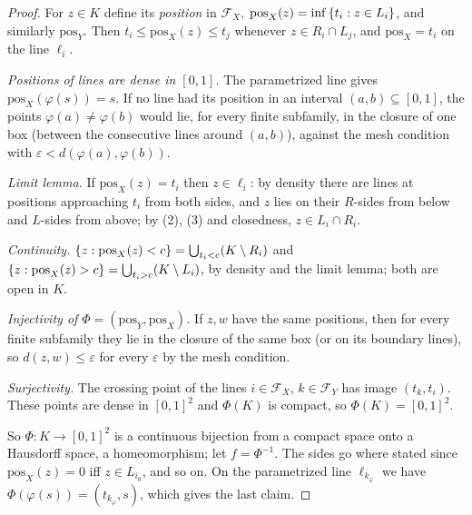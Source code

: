\begin{proof}
For $z\in K$ define its \emph{position} in $\mathcal F_X$, $\mathrm{pos}_X(z)=\inf\left\{ t_i:z\in L_i \right\}$, and similarly $\mathrm{pos}_Y$.
Then $t_i\le\mathrm{pos}_X(z)\le t_j$ whenever $z\in R_i\cap L_j$, and $\mathrm{pos}_X=t_i$ on the line $\ell_i$.

\emph{Positions of lines are dense in $[0,1]$.} The parametrized line gives $\mathrm{pos}_X(\varphi(s))=s$. If no line had its
position in an interval $(a,b)\subseteq[0,1]$, the points $\varphi(a)\ne\varphi(b)$ would lie, for every finite subfamily, in the
closure of one box (between the consecutive lines around $(a,b)$), against the mesh condition with $\varepsilon<d(\varphi(a),
\varphi(b))$.

\emph{Limit lemma.} If $\mathrm{pos}_X(z)=t_i$ then $z\in\ell_i$: by density there are lines at positions approaching $t_i$ from
both sides, and $z$ lies on their $R$-sides from below and $L$-sides from above; by (2), (3) and closedness, $z\in L_i\cap R_i$.

\emph{Continuity.} $\left\{ z:\mathrm{pos}_X(z)<c \right\}=\bigcup_{t_i<c}(K\setminus R_i)$ and $\left\{ z:\mathrm{pos}_X(z)>c \right\}=\bigcup_{t_i>c}
(K\setminus L_i)$, by density and the limit lemma; both are open in $K$.

\emph{Injectivity of $\Phi=(\mathrm{pos}_Y,\mathrm{pos}_X)$.} If $z,w$ have the same positions, then for every finite subfamily they lie in
the closure of the same box (or on its boundary lines), so $d(z,w)\le\varepsilon$ for every $\varepsilon$ by the mesh condition.

\emph{Surjectivity.} The crossing point of the lines $i\in\mathcal F_X$, $k\in\mathcal F_Y$ has image $(t_k,t_i)$. These points are dense in
$[0,1]^2$ and $\Phi(K)$ is compact, so $\Phi(K)=[0,1]^2$.

So $\Phi\colon K\to[0,1]^2$ is a continuous bijection from a compact space onto a Hausdorff space, a homeomorphism; let $f=\Phi^{-1}$. The
sides go where stated since $\mathrm{pos}_X(z)=0$ iff $z\in L_{i_0}$, and so on. On the parametrized line $\ell_{k_\varphi}$ we have
$\Phi(\varphi(s))=(t_{k_\varphi},s)$, which gives the last claim.
\end{proof}


